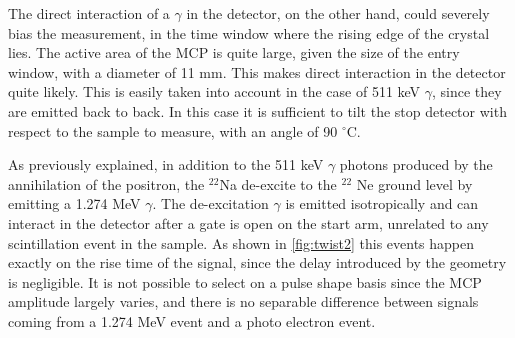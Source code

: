 The direct interaction of a $\gamma$ in the detector, on the other hand, could severely bias the measurement, in the time window where the rising edge of the crystal lies. 
The active area of the MCP is quite large, given the size of the entry window, with a diameter of 11 mm. This makes direct interaction in the detector quite likely.
This is easily taken into account in the case of 511 keV $\gamma$, since they are emitted back to back. In this case it is sufficient to tilt the stop detector with respect to the sample to measure, with an angle of 90 $^{\circ}$C.

As previously explained, in addition to the 511 keV $\gamma$ photons produced by the annihilation of the positron, the $^{22}$Na de-excite to the $^{22}$ Ne ground level by emitting a 1.274 MeV $\gamma$. 
The de-excitation $\gamma$ is emitted isotropically and can interact in the detector after a gate is open on the start arm, unrelated to any scintillation event in the sample.
As shown in \ref{fig:twist2} this events happen exactly on the rise time of the signal, since the delay introduced by the geometry is negligible.
It is not possible to select on a pulse shape basis since the MCP amplitude largely varies, and there is no separable difference between signals coming from a 1.274 MeV event and a photo electron event.

